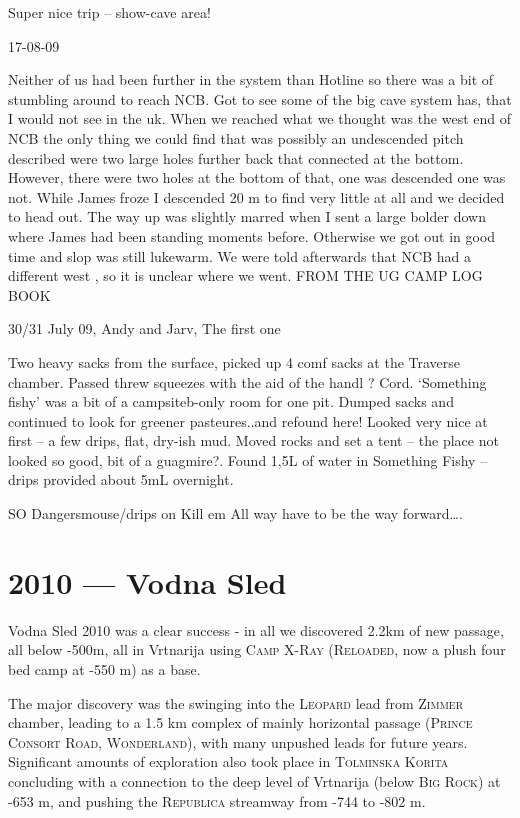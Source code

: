Super nice trip -- show-cave area!

17-08-09

Neither of us had been further in the system than Hotline so there was a
bit of stumbling around to reach NCB. Got to see some of the big cave
system has, that I would not see in the uk. When we reached what we
thought was the west end of NCB the only thing we could find that was
possibly an undescended pitch described were two large holes further
back that connected at the bottom. However, there were two holes at the
bottom of that, one was descended one was not. While James froze I
descended 20 m to find very little at all and we decided to head out.
The way up was slightly marred when I sent a large bolder down where
James had been standing moments before. Otherwise we got out in good
time and slop was still lukewarm. We were told afterwards that NCB had a
different west , so it is unclear where we went. FROM THE UG CAMP LOG
BOOK

30/31 July 09, Andy and Jarv, The first one

Two heavy sacks from the surface, picked up 4 comf sacks at the Traverse
chamber. Passed threw squeezes with the aid of the handl ? Cord.
`Something fishy' was a bit of a campsiteb-only room for one pit. Dumped
sacks and continued to look for greener pasteures..and refound here!
Looked very nice at first -- a few drips, flat, dry-ish mud. Moved rocks
and set a tent -- the place not looked so good, bit of a guagmire?.
Found 1,5L of water in Something Fishy -- drips provided about 5mL
overnight.

SO Dangersmouse/drips on Kill em All way have to be the way
forward\ldots{}.

\hypertarget{vodna-sled}{%
\chapter{2010 --- Vodna Sled}\label{vodna-sled}}

Vodna Sled 2010 was a clear success - in all we discovered 2.2km of new
passage, all below -500m, all in Vrtnarija using \textsc{Camp
X-Ray} (\textsc{Reloaded}, now a plush four bed camp at -550 m) as a
base.

The major discovery was the swinging into the \textsc{Leopard} lead from
\textsc{Zimmer} chamber, leading to a 1.5 km complex of mainly
horizontal passage (\textsc{Prince Consort Road}, \textsc{Wonderland}),
with many unpushed leads for future years. Significant amounts of
exploration also took place in \textsc{Tolminska Korita} concluding with
a connection to the deep level of Vrtnarija (below \textsc{Big Rock}) at
-653 m, and pushing the \textsc{Republica} streamway from -744 to -802
m.

